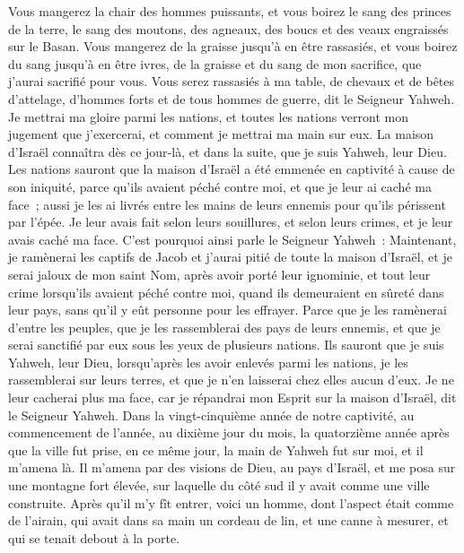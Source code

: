 \begin{multicols}{2}
Vous mangerez la chair des hommes puissants, et vous boirez le sang des princes de la terre, le sang des moutons, des agneaux, des boucs et des veaux engraissés sur le Basan.
Vous mangerez de la graisse jusqu'à en être rassasiés, et vous boirez du sang jusqu'à en être ivres, de la graisse et du sang de mon sacrifice, que j'aurai sacrifié pour vous.
Vous serez rassasiés à ma table, de chevaux et de bêtes d'attelage, d'hommes forts et de tous hommes de guerre, dit le Seigneur Yahweh.
Je mettrai ma gloire parmi les nations, et toutes les nations verront mon jugement que j'exercerai, et comment je mettrai ma main sur eux.
La maison d'Israël connaîtra dès ce jour-là, et dans la suite, que je suis Yahweh, leur Dieu.
Les nations sauront que la maison d'Israël a été emmenée en captivité à cause de son iniquité, parce qu'ils avaient péché contre moi, et que je leur ai caché ma face~; aussi je les ai livrés entre les mains de leurs ennemis pour qu'ils périssent par l'épée.
Je leur avais fait selon leurs souillures, et selon leurs crimes, et je leur avais caché ma face.
C'est pourquoi ainsi parle le Seigneur Yahweh~: Maintenant, je ramènerai les captifs de Jacob et j'aurai pitié de toute la maison d'Israël, et je serai jaloux de mon saint Nom,
après avoir porté leur ignominie, et tout leur crime lorsqu'ils avaient péché contre moi, quand ils demeuraient en sûreté dans leur pays, sans qu'il y eût personne pour les effrayer.
Parce que je les ramènerai d'entre les peuples, que je les rassemblerai des pays de leurs ennemis, et que je serai sanctifié par eux sous les yeux de plusieurs nations.
Ils sauront que je suis Yahweh, leur Dieu, lorsqu'après les avoir enlevés parmi les nations, je les rassemblerai sur leurs terres, et que je n'en laisserai chez elles aucun d'eux.
Je ne leur cacherai plus ma face, car je répandrai mon Esprit sur la maison d'Israël, dit le Seigneur Yahweh.
\VerseOne{}Dans la vingt-cinquième année de notre captivité, au commencement de l'année, au dixième jour du mois, la quatorzième année après que la ville fut prise, en ce même jour, la main de Yahweh fut sur moi, et il m'amena là.
Il m'amena par des visions de Dieu, au pays d'Israël, et me posa sur une montagne fort élevée, sur laquelle du côté sud il y avait comme une ville construite.
Après qu'il m'y fît entrer, voici un homme, dont l'aspect était comme de l'airain, qui avait dans sa main un cordeau de lin, et une canne à mesurer, et qui se tenait debout à la porte.

\end{multicols}
